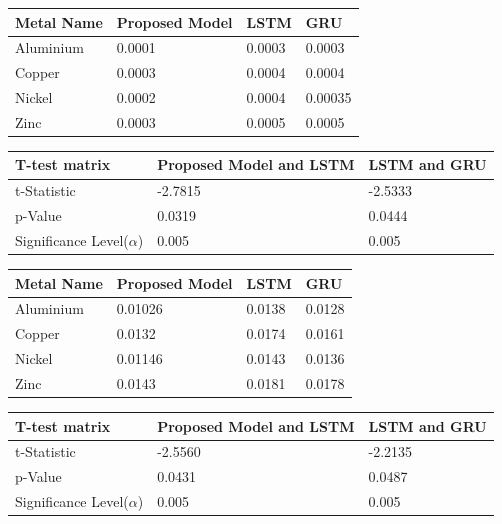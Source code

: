 \documentclass[preprint,12pt]{elsarticle}
\begin{document}
\begin{table}
	{\begin{tabular}{|p{3cm}|p{2cm}|p{2cm}|p{2cm}|} \hline
			\textbf{Metal Name} & \textbf{Proposed Model} & \textbf{LSTM} & \textbf{GRU}\\ \hline 
			Aluminium  & 0.0001 & 0.0003 & 0.0003\\ \hline 
			Copper  & 0.0003 & 0.0004 & 0.0004\\ \hline
			Nickel  & 0.0002 & 0.0004 & 0.00035\\ \hline
			Zinc  & 0.0003 & 0.0005 & 0.0005\\ \hline
	\end{tabular}}
	\label{tab37}
\end{table}




\begin{table}
	{\begin{tabular}{|p{3cm}|p{3cm}|p{3cm}|} \hline
			\textbf{T-test matrix} & \textbf{Proposed Model and LSTM} & \textbf{LSTM and GRU} \\ \hline 
			t-Statistic  & -2.7815 & -2.5333 \\ \hline 
			p-Value  & 0.0319 & 0.0444 \\ \hline
			Significance Level($\alpha$)  & 0.005 & 0.005 \\ \hline
			
	\end{tabular}}
	\label{tab38}
\end{table}


\begin{table}
	{\begin{tabular}{|p{3cm}|p{2cm}|p{2cm}|p{2cm}|} \hline
			\textbf{Metal Name} & \textbf{Proposed Model} & \textbf{LSTM} & \textbf{GRU}\\ \hline 
			Aluminium  & 0.01026 & 0.0138 & 0.0128\\ \hline 
			Copper  & 0.0132 & 0.0174 & 0.0161\\ \hline
			Nickel  & 0.01146 & 0.0143 & 0.0136\\ \hline
			Zinc  & 0.0143 & 0.0181 & 0.0178\\ \hline
	\end{tabular}}
	\label{tab39}
\end{table}


\begin{table}
	{\begin{tabular}{|p{3cm}|p{3cm}|p{3cm}|} \hline
			\textbf{T-test matrix} & \textbf{Proposed Model and LSTM} & \textbf{LSTM and GRU} \\ \hline 
			t-Statistic  & -2.5560 & -2.2135 \\ \hline 
			p-Value  & 0.0431 & 0.0487 \\ \hline
			Significance Level($\alpha$)  & 0.005 & 0.005 \\ \hline
			
	\end{tabular}}
	\label{tab40}
\end{table}
\end{document}
